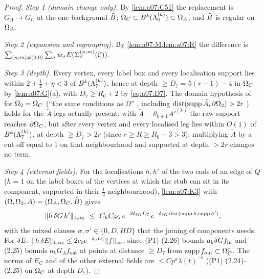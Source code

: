 \begin{proof}
\emph{Step 1 (domain change only).} By \cref{lem:a07:C51} the replacement is $G_A\to G_C$ at the one background $\tilde B$; $\Omega_{C}\subset B^k(\Lambda^{(k)}_0)\subset\Omega_{A}$, and $\tilde B$ is regular on $\Omega_{A}$.

\emph{Step 2 (expansion and regrouping).} By \cref{lem:a07:M,lem:a07:R} the difference is $\sum_{(n,m)\ne(0,0)}\sum_\sigma w_\sigma E(\Sigma^{(n,m)}_\sigma(\mathcal C))$.

\emph{Step 3 (depth).} Every vertex, every label box and every localisation support lies within $2+\frac14+\eta<3$ of $B^k(\Lambda^{(k)}_{7})$, hence at depth $\ge D_7=5(r-1)-4$ in $\Omega_{C}$ by \cref{lem:a07:G}(a), with $D_7\ge R_0+2$ by \eqref{eq:a07:D7}. The domain hypothesis of \cite[Prop.~1]{Ba3} for $\Omega_2=\Omega_{C}$ (``the same conditions as $\Omega$'' \cite[p.~414]{Ba3}, including $\operatorname{dist}(\operatorname{supp}\tilde A,\partial\Omega_2)>2r$ \cite[p.~412]{Ba3}) holds for the $\tilde A$-legs actually present: with $\tilde A=\theta_{k+1}A'^{(k)}$ the raw support reaches $\partial\Omega_{C}$, but after \cite[p.~579]{Ba2} every vertex and every localised leg lies within $O(1)$ of $B^k(\Lambda^{(k)}_{7})$, at depth $\ge D_7>2r$ (since $r\ge R\ge R_0+3>3$); multiplying $\tilde A$ by a cut-off equal to $1$ on that neighbourhood and supported at depth $>2r$ changes no term.

\emph{Step 4 (external fields).} For the localisations $h,h'$ of the two ends of an edge of $Q$ ($h=1$ on the label boxes of the vertices at which the stub can sit in its component, supported in their $\frac14$-neighbourhood), \cref{lem:a07:K3} with $(\Omega,\Omega_2,A)=(\Omega_{A},\Omega_{C},\tilde B)$ gives
\[
\norm{h\,\dG\,h'}_{1,\alpha_0}\ \le\ C_hC_{\dG}\,e^{-2\delta_{\dG}D_7}\,e^{-\delta_{\dG}\dist(\supp h,\supp h')},
\]
with the mixed clauses $\sigma,\sigma'\in\{0,D,HD\}$ that the joining of components needs. For $\delta E$: $\lVert h\,\delta E\rVert_{1,\alpha_0}\le2c_0e^{-\delta_0D_7}\lVert f\rVert_\infty$, since (P1) (2.26) bounds $a_k\delta G f_{\mathrm{in}}$ and (2.25) bounds $a_kG_Af_{\mathrm{out}}$ at points at distance $\ge D_7$ from $\operatorname{supp} f_{\mathrm{out}}\subset\Omega_{C}^c$. The norms of $E_C$ and of the other external fields are $\le Cp^a\lambda(t)^{-b}$ ((P1) (2.24)--(2.25) on $\Omega_{C}$ at depth $D_7$).


\end{proof}
